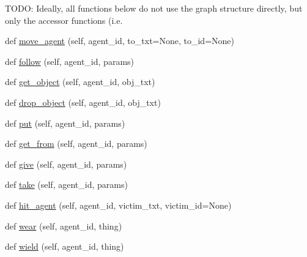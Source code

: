 \begin{DoxyCompactItemize}
\begin{DoxyCompactList}
 T\+O\+DO\+: Ideally, all functions below do not use the graph structure directly, but only the accessor functions (i.\+e. \end{DoxyCompactList}\item 
def \hyperlink{classmastering__the__dungeon_1_1tasks_1_1graph__world2_1_1graph_1_1Graph_a6a9b3f161580f744e976edd2e67f1b23}{move\+\_\+agent} (self, agent\+\_\+id, to\+\_\+txt=None, to\+\_\+id=None)
\item 
def \hyperlink{classmastering__the__dungeon_1_1tasks_1_1graph__world2_1_1graph_1_1Graph_aa15fc9576acfd82be1d58fd75e42c746}{follow} (self, agent\+\_\+id, params)
\item 
def \hyperlink{classmastering__the__dungeon_1_1tasks_1_1graph__world2_1_1graph_1_1Graph_a8bd1d9fe1ede5105100e8f9fee16cf97}{get\+\_\+object} (self, agent\+\_\+id, obj\+\_\+txt)
\item 
def \hyperlink{classmastering__the__dungeon_1_1tasks_1_1graph__world2_1_1graph_1_1Graph_a9ba4511655170a43b78a2600d8749a78}{drop\+\_\+object} (self, agent\+\_\+id, obj\+\_\+txt)
\item 
def \hyperlink{classmastering__the__dungeon_1_1tasks_1_1graph__world2_1_1graph_1_1Graph_a2d51681410a2622832e94860e2030737}{put} (self, agent\+\_\+id, params)
\item 
def \hyperlink{classmastering__the__dungeon_1_1tasks_1_1graph__world2_1_1graph_1_1Graph_a3b953eab2aa57119b16c108db7ed0656}{get\+\_\+from} (self, agent\+\_\+id, params)
\item 
def \hyperlink{classmastering__the__dungeon_1_1tasks_1_1graph__world2_1_1graph_1_1Graph_aee862c606dc898f6f7336f9721b4151d}{give} (self, agent\+\_\+id, params)
\item 
def \hyperlink{classmastering__the__dungeon_1_1tasks_1_1graph__world2_1_1graph_1_1Graph_af0e00cef49829df438b8687ff03afc94}{take} (self, agent\+\_\+id, params)
\item 
def \hyperlink{classmastering__the__dungeon_1_1tasks_1_1graph__world2_1_1graph_1_1Graph_a044b163ff53309b39883977585ae7434}{hit\+\_\+agent} (self, agent\+\_\+id, victim\+\_\+txt, victim\+\_\+id=None)
\item 
def \hyperlink{classmastering__the__dungeon_1_1tasks_1_1graph__world2_1_1graph_1_1Graph_a1a12d47f2f85ede7b8351ba138238bf2}{wear} (self, agent\+\_\+id, thing)
\item 
def \hyperlink{classmastering__the__dungeon_1_1tasks_1_1graph__world2_1_1graph_1_1Graph_a7e14bcd6bc0463bb02d81e13e19ae280}{wield} (self, agent\+\_\+id, thing)
\item 

\end{DoxyCompactItemize}
